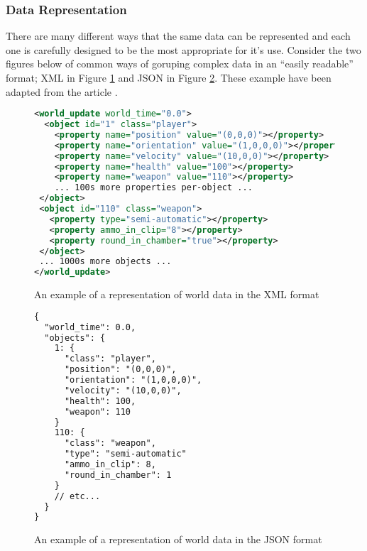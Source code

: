 \subsubsection{Data Representation}
There are many different ways that the same data can be represented and each one is carefully designed to be the most appropriate for it's use. Consider the two figures below of common ways of goruping complex data in an ``easily readable'' format; XML in Figure \ref{fig:xml-example} and JSON in Figure \ref{fig:json-example}. These example have been adapted from the article .

\newpage
\begin{figure}[!ht]
\begin{lstlisting}[language=xml]
<world_update world_time="0.0">
  <object id="1" class="player">
    <property name="position" value="(0,0,0)"></property>
    <property name="orientation" value="(1,0,0,0)"></property>
    <property name="velocity" value="(10,0,0)"></property>
    <property name="health" value="100"></property>
    <property name="weapon" value="110"></property>
    ... 100s more properties per-object ...
 </object>
 <object id="110" class="weapon">
   <property type="semi-automatic"></property>
   <property ammo_in_clip="8"></property>
   <property round_in_chamber="true"></property>
 </object>
 ... 1000s more objects ...
</world_update>
\end{lstlisting}

\caption{An example of a representation of world data in the XML format}
\label{fig:xml-example}
\end{figure}

\begin{figure}[!ht]
\begin{lstlisting}[language=xml]
{
  "world_time": 0.0,
  "objects": {
    1: {
      "class": "player",
      "position": "(0,0,0)",
      "orientation": "(1,0,0,0)",
      "velocity": "(10,0,0)",
      "health": 100,
      "weapon": 110
    }
    110: {
      "class": "weapon",
      "type": "semi-automatic"
      "ammo_in_clip": 8,
      "round_in_chamber": 1
    }
    // etc...
  }
}
\end{lstlisting}

\caption{An example of a representation of world data in the JSON format}
\label{fig:json-example}
\end{figure}

\newpage


